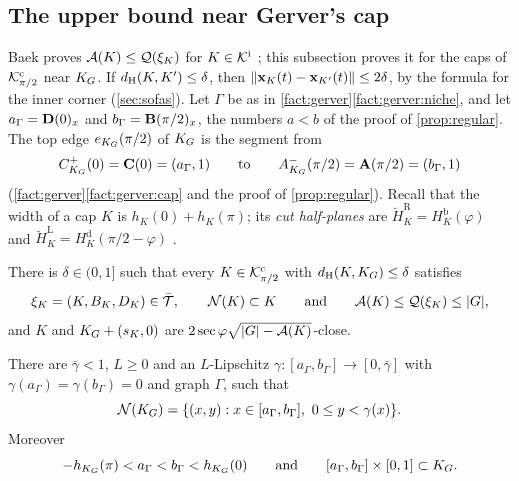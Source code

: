 \subsection{The upper bound near Gerver's cap}\label{sec:stab-local}

Baek proves $\mathcal{A}(K)\le\mathcal{Q}(\xi_K)$ for $K\in\mathcal{K}^{\mathrm{i}}$ ; this
subsection proves it for the caps of $\mathcal{K}^{\mathrm{c}}_{\pi/2}$ near $K_G$. If
$d_{\mathrm{H}}(K,K')\le\delta$, then $\lVert \mathbf{x}_K(t)-\mathbf{x}_{K'}(t)\rVert\le2\delta$, by the
formula for the inner corner (\cref{sec:sofas}). Let $\Gamma$ be as in
\cref{fact:gerver}\ref{fact:gerver:niche}, and let $a_\Gamma=\mathbf{D}(0)_x$ and
$b_\Gamma=\mathbf{B}(\pi/2)_x$, the numbers $a<b$ of the proof of
\cref{prop:regular}. The top edge $e_{K_G}(\pi/2)$ of $K_G$ is the segment from
\[
  C^+_{K_G}(0)=\mathbf{C}(0)=(a_\Gamma,1)\qquad\text{to}\qquad
  A^-_{K_G}(\pi/2)=\mathbf{A}(\pi/2)=(b_\Gamma,1)
\]
(\cref{fact:gerver}\ref{fact:gerver:cap} and the proof of \cref{prop:regular}).
Recall that the width of a cap $K$ is $h_K(0)+h_K(\pi)$; its \emph{cut
half-planes} are $\breve H^{\mathrm R}_K=H^{\mathrm b}_K(\varphi)$ and
$\breve H^{\mathrm L}_K=H^{\mathrm d}_K(\pi/2-\varphi)$ .

\begin{proposition}\label{prop:stab-local}
There is $\delta\in(0,1]$ such that every $K\in\mathcal{K}^{\mathrm{c}}_{\pi/2}$ with
$d_{\mathrm{H}}(K,K_G)\le\delta$ satisfies
\[
  \xi_K=(K,B_K,D_K)\in\bar{\mathcal{T}},\qquad\mathcal{N}(K)\subset K\qquad\text{and}\qquad
  \mathcal{A}(K)\le\mathcal{Q}(\xi_K)\le\lvert G\rvert,
\]
and $K$ and $K_G+(s_K,0)$ are $2\sec\varphi\sqrt{\lvert G\rvert-\mathcal{A}(K)}$-close.
\end{proposition}

\begin{lemma}\label{lem:stab-roof}
There are $\bar\gamma<1$, $L\ge0$ and an $L$-Lipschitz
$\gamma:[a_\Gamma,b_\Gamma]\to[0,\bar\gamma]$ with
$\gamma(a_\Gamma)=\gamma(b_\Gamma)=0$ and graph $\Gamma$, such that
\[
  \mathcal{N}(K_G)=\{(x,y):x\in[a_\Gamma,b_\Gamma],\ 0\le y<\gamma(x)\}.
\]
Moreover
\[
  -h_{K_G}(\pi)<a_\Gamma<b_\Gamma<h_{K_G}(0)\qquad\text{and}\qquad
  [a_\Gamma,b_\Gamma]\times[0,1]\subset K_G.
\]
\end{lemma}

